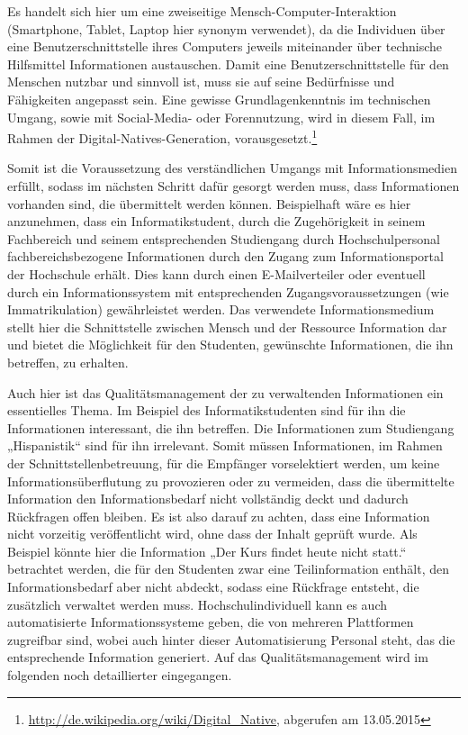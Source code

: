 Es handelt sich hier um eine zweiseitige Mensch-Computer-Interaktion (Smartphone, Tablet, Laptop hier synonym verwendet), da die Individuen über eine Benutzerschnittstelle ihres Computers jeweils miteinander über technische Hilfsmittel Informationen austauschen.
Damit eine Benutzerschnittstelle für den Menschen nutzbar und sinnvoll ist, muss sie auf seine Bedürfnisse und Fähigkeiten angepasst sein. 
Eine gewisse Grundlagenkenntnis im technischen Umgang, sowie mit Social-Media- oder Forennutzung, wird in diesem Fall, im Rahmen der Digital-Natives-Generation, vorausgesetzt.\footnote{\url{http://de.wikipedia.org/wiki/Digital_Native}, abgerufen am 13.05.2015}

Somit ist die Voraussetzung des verständlichen Umgangs mit Informationsmedien erfüllt, sodass im nächsten Schritt dafür gesorgt werden muss, dass Informationen vorhanden sind, die übermittelt werden können. 
Beispielhaft wäre es hier anzunehmen, dass ein Informatikstudent, durch die Zugehörigkeit in seinem Fachbereich und seinem entsprechenden Studiengang durch Hochschulpersonal fachbereichsbezogene Informationen durch den Zugang zum Informationsportal der Hochschule erhält. 
Dies kann durch einen E-Mailverteiler oder eventuell durch ein Informationssystem mit entsprechenden Zugangsvoraussetzungen (wie Immatrikulation) gewährleistet werden. 
Das verwendete Informationsmedium stellt hier die Schnittstelle zwischen Mensch und der Ressource Information dar und bietet die Möglichkeit für den Studenten, gewünschte Informationen, die ihn betreffen, zu erhalten.

Auch hier ist das Qualitätsmanagement der zu verwaltenden Informationen ein essentielles Thema. 
Im Beispiel des Informatikstudenten sind für ihn die Informationen interessant, die ihn betreffen. 
Die Informationen zum Studiengang „Hispanistik“ sind für ihn irrelevant. 
Somit müssen Informationen, im Rahmen der Schnittstellenbetreuung, für die Empfänger vorselektiert werden, um keine Informationsüberflutung zu provozieren oder zu vermeiden, dass die übermittelte Information den Informationsbedarf nicht vollständig deckt und dadurch Rückfragen offen bleiben. 
Es ist also darauf zu achten, dass eine Information nicht vorzeitig veröffentlicht wird, ohne dass der Inhalt geprüft wurde. 
Als Beispiel könnte hier die Information „Der Kurs findet heute nicht statt.“ betrachtet werden, die für den Studenten zwar eine Teilinformation enthält, den Informationsbedarf aber nicht abdeckt, sodass eine Rückfrage entsteht, die zusätzlich verwaltet werden muss. 
Hochschulindividuell kann es auch automatisierte Informationssysteme geben, die von mehreren Plattformen zugreifbar sind, wobei auch hinter dieser Automatisierung Personal steht, das die entsprechende Information generiert. 
Auf das Qualitätsmanagement wird im folgenden noch detaillierter eingegangen.

